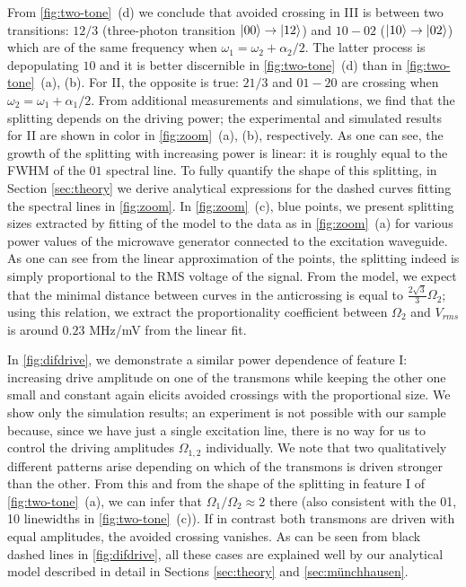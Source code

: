 \documentclass[%
 aps, prx,
 amsmath,amssymb,
 reprint,%
superscriptaddress
]{revtex4-2}
\begin{document}
From \autoref{fig:two-tone}~(d) we conclude that 
avoided crossing in III is between two 
transitions: ${12/3}$ (three-photon transition $\ket{00}\rightarrow\ket{12}$) and ${10} - {02}$ 
($\ket{10}\rightarrow\ket{02}$) which are of the 
same frequency when $\omega_1 = 
\omega_2+\alpha_2/2$. The latter process is depopulating $10$ and it is better discernible in \autoref{fig:two-tone}~(d) 
than in \autoref{fig:two-tone}~(a), (b). For II, the 
opposite is true: ${21/3}$ and ${01} - {20}$ are 
crossing when $\omega_2 = \omega_1+\alpha_1/2$. 
From additional measurements and simulations, we 
find that the splitting depends on the driving 
power; the experimental and simulated results for 
II are shown in color in \autoref{fig:zoom}~(a), (b), respectively. As one can see, the growth of the splitting with 
increasing power is linear: it is roughly equal 
to the FWHM of the ${01}$ spectral line. To fully 
quantify the shape of this splitting, in Section 
\ref{sec:theory} we derive analytical expressions 
for the dashed curves fitting the spectral lines 
in \autoref{fig:zoom}. In \autoref{fig:zoom}~(c), blue points, we present splitting sizes extracted by fitting of the model to the data as in \autoref{fig:zoom}~(a) for various power values of the microwave generator connected to the excitation waveguide. As one can see from the linear approximation of the points, the splitting indeed is simply proportional to the RMS voltage of the signal. From the model, we expect that the minimal distance between curves in the anticrossing is equal to $\frac{2\sqrt{3}}{3} \Omega_2$; using this relation, we extract the proportionality coefficient between $\Omega_2$ and $V_{rms}$ is around $0.23$ MHz/mV from the linear fit.

In \autoref{fig:difdrive}, we demonstrate a similar power dependence of feature I: increasing drive amplitude on one of the 
transmons while keeping the other one small and 
constant again elicits avoided crossings with the 
proportional size. We  show only the simulation results; an experiment is not possible with our sample because, since we have just a single excitation line, there is 
no way for us to control the driving amplitudes 
$\Omega_{1,2}$ individually. We note that two 
qualitatively different patterns arise depending 
on which of the transmons is driven stronger than 
the other. From this and from the shape of the 
splitting in feature I of 
\autoref{fig:two-tone}~(a), we can infer that 
$\Omega_1/\Omega_2 \approx 2$ there (also 
consistent with the 01, 10 linewidths in 
\autoref{fig:two-tone}~(c)). If in contrast both transmons are driven with equal amplitudes, the avoided crossing vanishes. As can be seen from black dashed lines in \autoref{fig:difdrive}, all these cases are explained well by our analytical model described in detail in Sections \ref{sec:theory} and \ref{sec:münchhausen}.
\end{document}
